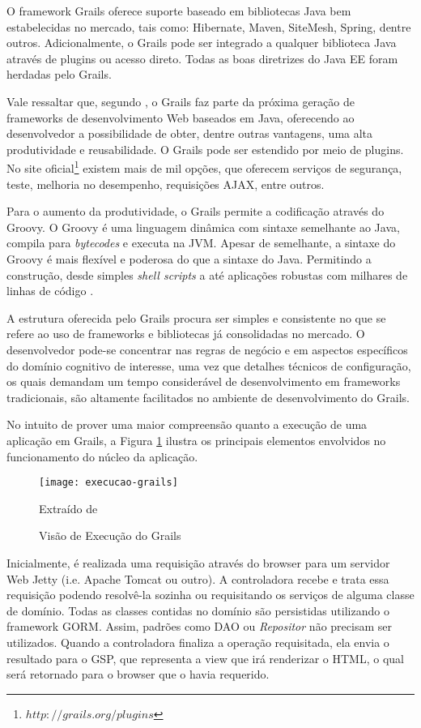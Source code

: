 O framework Grails oferece suporte baseado em bibliotecas Java bem estabelecidas no mercado, tais como: Hibernate, Maven, SiteMesh, Spring, dentre outros. Adicionalmente, o Grails pode ser integrado a qualquer biblioteca
Java através de plugins ou acesso direto. Todas as boas diretrizes do Java EE foram herdadas pelo Grails. 

Vale ressaltar que, segundo \cite{smith2009}, o Grails faz parte da próxima geração de frameworks de desenvolvimento Web baseados em Java, oferecendo ao desenvolvedor a possibilidade de obter, dentre outras vantagens, uma alta produtividade e reusabilidade. O Grails pode ser estendido por meio de plugins. No site oficial\footnote{$http://grails.org/plugins$} existem mais de mil opções, que oferecem serviços de segurança, teste, melhoria no desempenho, requisições AJAX, entre outros.

Para o aumento da produtividade, o Grails permite a codificação através do Groovy. O Groovy é uma linguagem dinâmica com sintaxe semelhante ao Java, compila para \textit{bytecodes} e executa na JVM. Apesar de semelhante, a sintaxe do Groovy é mais flexível e poderosa do que a sintaxe do Java. Permitindo a construção, desde simples \textit{shell scripts} a até aplicações robustas com milhares de linhas de código \cite{bashar2009}.   

A estrutura oferecida pelo Grails procura ser simples e consistente no que se refere ao uso de frameworks e bibliotecas já consolidadas no mercado. O desenvolvedor pode-se concentrar nas regras de negócio e em aspectos
específicos do domínio cognitivo de interesse, uma vez que detalhes técnicos de configuração, os quais demandam um tempo considerável de desenvolvimento em frameworks tradicionais, são altamente facilitados no ambiente de desenvolvimento do Grails.

No intuito de prover uma maior compreensão quanto a execução de uma aplicação em Grails, a Figura \ref{execucao-grails} ilustra os principais elementos envolvidos no funcionamento do núcleo da aplicação.

\graphicspath{{figuras/}}
\begin{figure}[H]
\centering
\texttt{[image: execucao-grails]}
\caption{Visão de Execução do Grails}{Extraído de \cite{juddbeginning2008}} 
\label{execucao-grails}
\end{figure}

Inicialmente, é realizada uma requisição através do browser para um servidor Web Jetty (i.e. Apache Tomcat ou outro). A controladora recebe e trata essa requisição podendo resolvê-la sozinha ou requisitando os serviços de
alguma classe de domínio. Todas as classes contidas no domínio são persistidas utilizando o framework GORM. Assim, padrões como DAO ou \textit{Repositor} não precisam ser utilizados. Quando a controladora finaliza a operação requisitada, ela envia o resultado para o GSP, que representa a view que irá renderizar o HTML, o qual será retornado para o browser que o havia requerido.

